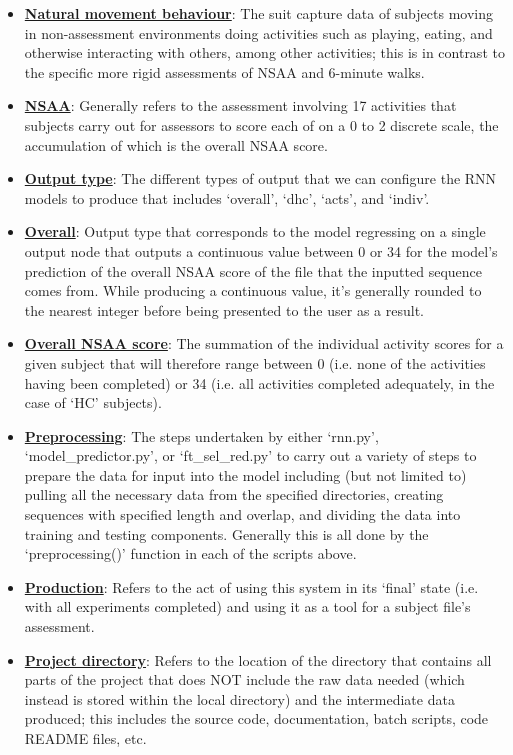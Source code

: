 \documentclass[12pt,twoside]{report}
\begin{document}
\begin{itemize}
	\item \underline{\textbf{Natural movement behaviour}}: The suit capture data of subjects moving in non-assessment environments doing activities such as playing, eating, and otherwise interacting with others, among other activities; this is in contrast to the specific more rigid assessments of NSAA and 6-minute walks.
	\item \underline{\textbf{NSAA}}: Generally refers to the assessment involving 17 activities that subjects carry out for assessors to score each of on a 0 to 2 discrete scale, the accumulation of which is the overall NSAA score.
	\item \underline{\textbf{Output type}}: The different types of output that we can configure the RNN models to produce that includes ‘overall’, ‘dhc’, ‘acts’, and ‘indiv’.
	\item \underline{\textbf{Overall}}: Output type that corresponds to the model regressing on a single output node that outputs a continuous value between 0 or 34 for the model’s prediction of the overall NSAA score of the file that the inputted sequence comes from. While producing a continuous value, it’s generally rounded to the nearest integer before being presented to the user as a result.
	\item \underline{\textbf{Overall NSAA score}}: The summation of the individual activity scores for a given subject that will therefore range between 0 (i.e. none of the activities having been completed) or 34 (i.e. all activities completed adequately, in the case of ‘HC’ subjects).
	\item \underline{\textbf{Preprocessing}}: The steps undertaken by either ‘rnn.py’, ‘model\_predictor.py’, or ‘ft\_sel\_red.py’ to carry out a variety of steps to prepare the data for input into the model including (but not limited to) pulling all the necessary data from the specified directories, creating sequences with specified length and overlap, and dividing the data into training and testing components. Generally this is all done by the ‘preprocessing()’ function in each of the scripts above.
	\item \underline{\textbf{Production}}: Refers to the act of using this system in its ‘final’ state (i.e. with all experiments completed) and using it as a tool for a subject file’s assessment.
	\item \underline{\textbf{Project directory}}: Refers to the location of the directory that contains all parts of the project that does NOT include the raw data needed (which instead is stored within the local directory) and the intermediate data produced; this includes the source code, documentation, batch scripts, code README files, etc.

\end{itemize}
\end{document}
